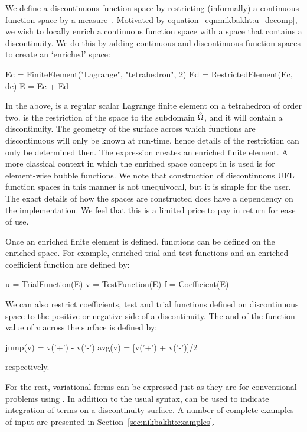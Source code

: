 We define a discontinuous function space by restricting (informally)
a continuous function space by a measure~. Motivated by
equation~\eqref{eqn:nikbakht:u_decomp}, we wish to locally enrich a
continuous function space with a space that contains a discontinuity. We
do this by adding continuous and discontinuous function spaces to create
an `enriched' space:
%
\begin{python}
Ec = FiniteElement("Lagrange", "tetrahedron", 2)
Ed = RestrictedElement(Ec, dc)
E  = Ec + Ed
\end{python}
%
In the above,  is a regular scalar Lagrange finite element
on a tetrahedron of order two.  is the restriction of the
space  to the subdomain $\Hat{\Omega}$, and it will contain
a discontinuity. The geometry of the surface across which functions
are discontinuous will only be known at run-time, hence details of the
restriction can only be determined then. The expression  creates an enriched finite element. A more classical context in
which the enriched space concept in \ufl{} is used is for element-wise
bubble functions.  We note that construction of discontinuous UFL function
spaces in this manner is not unequivocal, but it is simple for the user.
The exact details of how the spaces are constructed does have a dependency
on the implementation. We feel that this is a limited price to pay in
return for ease of use.

Once an enriched finite element is defined, functions can be defined on
the enriched space. For example, enriched trial and test functions and
an enriched coefficient function are defined by:
%
\begin{python}
u = TrialFunction(E)
v = TestFunction(E)
f = Coefficient(E)
\end{python}
%
We can also restrict coefficients, test and trial functions
defined on discontinuous space to the positive or negative side of a
discontinuity. The  and  of the function value
of $v$ across the surface is defined by:
%
\begin{python}
jump(v) = v('+') - v('-')
avg(v)  = [v('+') + v('-')]/2
\end{python}
%
respectively.

For the rest, variational forms can be expressed just as they are for
conventional problems using \ufl{}. In addition to the usual \ufl{}
syntax,  can be used to indicate integration of terms on a
discontinuity surface.  A number of complete examples of \ufl{} input
are presented in Section~\ref{sec:nikbakht:examples}.

